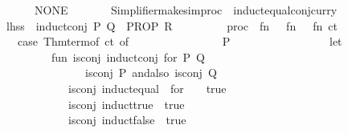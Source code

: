 \begin{isabellebody}
\ \ \ \ \ \ \ \ \ \ {\isacharbar}{\kern0pt}\ {\isacharunderscore}{\kern0pt}\ {\isacharequal}{\kern0pt}{\isachargreater}{\kern0pt}\ NONE{\isacharparenright}{\kern0pt}{\isacharbraceright}{\kern0pt}{\isacharcomma}{\kern0pt}\isanewline
\ \ \ \ \ \ \ Simplifier{\isachardot}{\kern0pt}make{\isacharunderscore}{\kern0pt}simproc\ \isactrlcontext \ {\isachardoublequote}{\kern0pt}induct{\isacharunderscore}{\kern0pt}equal{\isacharunderscore}{\kern0pt}conj{\isacharunderscore}{\kern0pt}curry{\isachardoublequote}{\kern0pt}\isanewline
\ \ \ \ \ \ \ \ {\isacharbraceleft}{\kern0pt}lhss\ {\isacharequal}{\kern0pt}\ {\isacharbrackleft}{\kern0pt}\isactrlterm {\isasymopen}induct{\isacharunderscore}{\kern0pt}conj\ P\ Q\ {\isasymLongrightarrow}\ PROP\ R{\isasymclose}{\isacharbrackright}{\kern0pt}{\isacharcomma}{\kern0pt}\isanewline
\ \ \ \ \ \ \ \ \ proc\ {\isacharequal}{\kern0pt}\ fn\ {\isacharunderscore}{\kern0pt}\ {\isacharequal}{\kern0pt}{\isachargreater}{\kern0pt}\ fn\ {\isacharunderscore}{\kern0pt}\ {\isacharequal}{\kern0pt}{\isachargreater}{\kern0pt}\ fn\ ct\ {\isacharequal}{\kern0pt}{\isachargreater}{\kern0pt}\isanewline
\ \ \ \ \ \ \ \ \ \ {\isacharparenleft}{\kern0pt}case\ Thm{\isachardot}{\kern0pt}term{\isacharunderscore}{\kern0pt}of\ ct\ of\isanewline
\ \ \ \ \ \ \ \ \ \ \ \ {\isacharunderscore}{\kern0pt}\ {\isachardollar}{\kern0pt}\ {\isacharparenleft}{\kern0pt}{\isacharunderscore}{\kern0pt}\ {\isachardollar}{\kern0pt}\ P{\isacharparenright}{\kern0pt}\ {\isachardollar}{\kern0pt}\ {\isacharunderscore}{\kern0pt}\ {\isacharequal}{\kern0pt}{\isachargreater}{\kern0pt}\isanewline
\ \ \ \ \ \ \ \ \ \ \ \ \ \ let\isanewline
\ \ \ \ \ \ \ \ \ \ \ \ \ \ \ \ fun\ is{\isacharunderscore}{\kern0pt}conj\ \isactrlConstUNDERSCORE {\isasymopen}induct{\isacharunderscore}{\kern0pt}conj\ for\ P\ Q{\isasymclose}\ {\isacharequal}{\kern0pt}\isanewline
\ \ \ \ \ \ \ \ \ \ \ \ \ \ \ \ \ \ \ \ \ \ is{\isacharunderscore}{\kern0pt}conj\ P\ andalso\ is{\isacharunderscore}{\kern0pt}conj\ Q\isanewline
\ \ \ \ \ \ \ \ \ \ \ \ \ \ \ \ \ \ {\isacharbar}{\kern0pt}\ is{\isacharunderscore}{\kern0pt}conj\ \isactrlConstUNDERSCORE {\isasymopen}induct{\isacharunderscore}{\kern0pt}equal\ {\isacharunderscore}{\kern0pt}\ for\ {\isacharunderscore}{\kern0pt}\ {\isacharunderscore}{\kern0pt}{\isasymclose}\ {\isacharequal}{\kern0pt}\ true\isanewline
\ \ \ \ \ \ \ \ \ \ \ \ \ \ \ \ \ \ {\isacharbar}{\kern0pt}\ is{\isacharunderscore}{\kern0pt}conj\ \isactrlConstUNDERSCORE {\isasymopen}induct{\isacharunderscore}{\kern0pt}true{\isasymclose}\ {\isacharequal}{\kern0pt}\ true\isanewline
\ \ \ \ \ \ \ \ \ \ \ \ \ \ \ \ \ \ {\isacharbar}{\kern0pt}\ is{\isacharunderscore}{\kern0pt}conj\ \isactrlConstUNDERSCORE {\isasymopen}induct{\isacharunderscore}{\kern0pt}false{\isasymclose}\ {\isacharequal}{\kern0pt}\ true\isanewline

\end{isabellebody}

